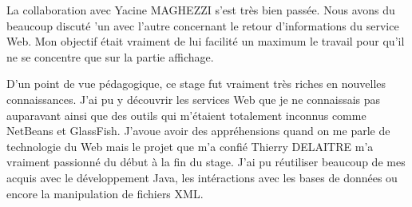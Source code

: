 La collaboration avec Yacine MAGHEZZI s'est tr\`es bien pass\'ee.
Nous avons du beaucoup discut\'e 'un avec l'autre concernant le retour d'informations du service Web.
Mon objectif \'etait vraiment de lui facilit\'e un maximum le travail pour qu'il ne se concentre que sur la partie affichage.

D'un point de vue p\'edagogique, ce stage fut vraiment tr\`es riches en nouvelles connaissances.
J'ai pu y d\'ecouvrir les services Web que je ne connaissais pas auparavant ainsi que des outils qui m'\'etaient totalement inconnus comme NetBeans et GlassFish.
J'avoue avoir des appr\'ehensions quand on me parle de technologie du Web mais le projet que m'a confi\'e Thierry DELAITRE m'a vraiment passionn\'e du d\'ebut \`a la fin du stage.
J'ai pu r\'eutiliser beaucoup de mes acquis avec le d\'eveloppement Java, les int\'eractions avec les bases de donn\'ees ou encore la manipulation de fichiers XML.



\clearpage
